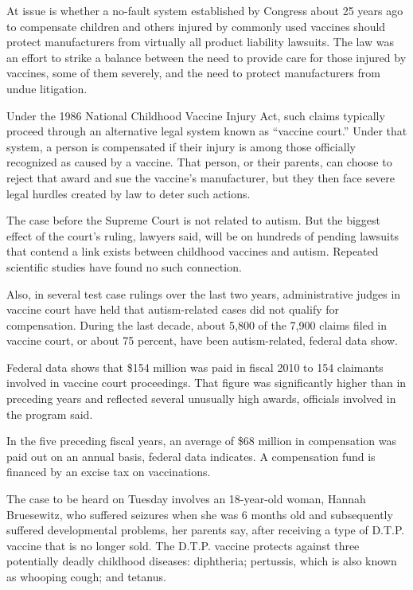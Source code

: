 ﻿\documentclass[12pt]{article}
\begin{document}
At issue is whether a no-fault system established by Congress about 25 years ago to compensate
children and others injured by commonly used vaccines should protect manufacturers from virtually
all product liability lawsuits. The law was an effort to strike a balance between the need to
provide care for those injured by vaccines, some of them severely, and the need to protect
manufacturers from undue litigation.

Under the 1986 National Childhood Vaccine Injury Act, such claims typically proceed through an
alternative legal system known as ``vaccine court.'' Under that system, a person is compensated if
their injury is among those officially recognized as caused by a vaccine. That person, or their
parents, can choose to reject that award and sue the vaccine's manufacturer, but they then face
severe legal hurdles created by law to deter such actions.

The case before the Supreme Court is not related to autism. But the biggest effect of the court's
ruling, lawyers said, will be on hundreds of pending lawsuits that contend a link exists between
childhood vaccines and autism. Repeated scientific studies have found no such connection.

Also, in several test case rulings over the last two years, administrative judges in vaccine court
have held that autism-related cases did not qualify for compensation. During the last decade, about
5,800 of the 7,900 claims filed in vaccine court, or about 75 percent, have been autism-related,
federal data show.

Federal data shows that \$154 million was paid in fiscal 2010 to 154 claimants involved in vaccine
court proceedings. That figure was significantly higher than in preceding years and reflected
several unusually high awards, officials involved in the program said.

In the five preceding fiscal years, an average of \$68 million in compensation was paid out on an
annual basis, federal data indicates. A compensation fund is financed by an excise tax on
vaccinations.

The case to be heard on Tuesday involves an 18-year-old woman, Hannah Bruesewitz, who suffered
seizures when she was 6 months old and subsequently suffered developmental problems, her parents
say, after receiving a type of D.T.P. vaccine that is no longer sold. The D.T.P. vaccine protects
against three potentially deadly childhood diseases: diphtheria; pertussis, which is also known as
whooping cough; and tetanus.
\end{document}
